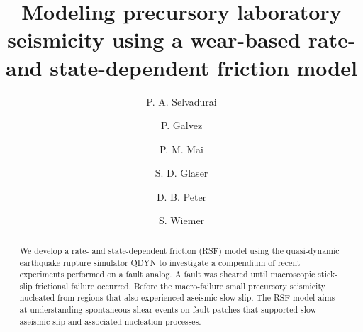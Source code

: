 \documentclass[preprint,1p, 10pt,authoryear]{elsarticle}
\begin{document}
\begin{frontmatter}



\title{Modeling precursory laboratory seismicity using a wear-based rate- and state-dependent friction model}

 \author[1]{P. A. Selvadurai }
\author[2]{P. Galvez}
\author[2]{P. M. Mai}
\author[3]{S. D. Glaser} 
\author[2]{D. B. Peter}
\author[1]{S. Wiemer} 



\address[1]{Swiss Seismological Service, ETH Zurich, Zurich, Switzerland}
\address[2]{King Abdullah University of Science and Technology, Thuwal, Saudi Arabia}
\address[3]{Civil and Environmental Engineering, University of California, Berkeley, California, USA}



\begin{abstract}
We develop a rate- and state-dependent friction (RSF) model using the quasi-dynamic earthquake rupture simulator QDYN to investigate a compendium of recent experiments performed on a fault analog. A fault was sheared until macroscopic stick-slip frictional failure occurred. Before the macro-failure small precursory seismicity nucleated from regions that also experienced aseismic slow slip. The RSF model aims at understanding spontaneous shear events on fault patches that supported slow aseismic slip and associated nucleation processes.  


\end{abstract}
\end{frontmatter}
\end{document}
